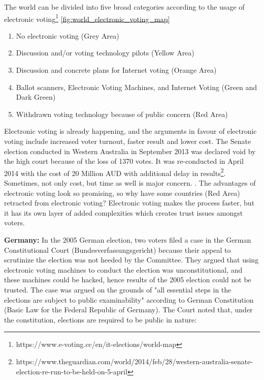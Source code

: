   The world can be divided into five broad categories according to 
  the usage of electronic voting\footnote{https://www.e-voting.cc/en/it-elections/world-map}
  \ref{fig:world_electronic_voting_map}
  \begin{enumerate}
  \item No electronic voting (Grey Area)
  \item Discussion and/or voting technology pilots (Yellow Area)
  \item Discussion and concrete plans for Internet voting (Orange Area)
  \item Ballot scanners, Electronic Voting Machines, and Internet Voting
        (Green and Dark Green)
  \item Withdrawn voting technology because of public concern (Red Area) 
  \end{enumerate}    
  
 

   
  Electronic voting is already happening, and the
  arguments in favour of electronic voting 
  include increased voter turnout, faster result and lower cost. The Senate 
  election conducted in Western Australia in September 2013 was 
  declared void by the high court because of the loss of 1370 votes. It was 
  re-conducted in April 2014 with the cost of 20 Million 
  AUD with additional  delay in results\footnote{https://www.theguardian.com/world/2014/feb/28/western-australia-senate-election-re-run-to-be-held-on-5-april}. Sometimes, 
  not only cost, but time as well is major concern.
  . 
  The advantages of electronic voting 
  look so promising, so why have some countries (Red Area) retracted 
  from electronic voting? Electronic voting makes 
  the process faster, but it has its own layer of added complexities 
  which creates trust issues amongst voters. 
  
  \textbf{Germany:} In the 2005 German election, two voters filed a case in the German 
  Constitutional Court (Bundesverfassungsgericht) because their 
  appeal to scrutinize the election 
  was not heeded by the Committee. They argued that using electronic 
  voting machines to conduct the election was unconstitutional, and 
  these machines could be hacked, hence results of the 2005 election 
  could not be trusted. The case was argued on the grounds 
  of "all essential steps in the elections are subject to 
  public examinability" according to German Constitution 
  (Basic Law for the Federal Republic of Germany). 
  The Court noted that, under the constitution, elections are 
  required to be public in nature:
  
